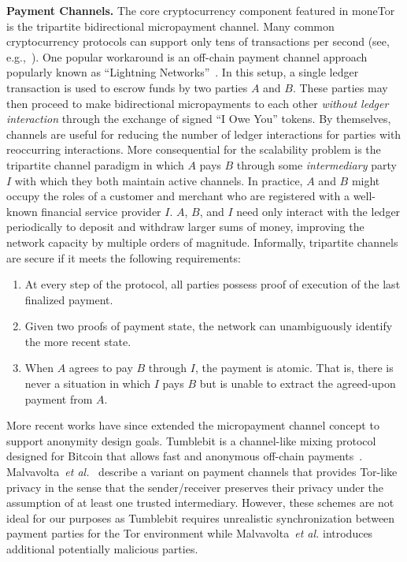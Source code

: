 \medskip \noindent\textbf{Payment Channels.}
The core cryptocurrency component featured in moneTor is the tripartite bidirectional micropayment channel.
Many common cryptocurrency protocols can support only tens of transactions per second (see, e.g.,~\cite{team2018blockchain}).
One popular workaround is an off-chain payment channel approach popularly known as ``Lightning Networks''~\cite{poon2016bitcoin}.
In this setup, a single ledger transaction is used to escrow funds by two parties $A$ and $B$.
These parties may then proceed to make bidirectional micropayments to each other \emph{without ledger interaction} through the exchange of signed ``I Owe You'' tokens.
By themselves, channels are useful for reducing the number of ledger interactions for parties with reoccurring interactions.
More consequential for the scalability problem is the tripartite channel paradigm in which $A$ pays $B$ through some \emph{intermediary} party $I$ with which they both maintain active channels.
In practice, $A$ and $B$ might occupy the roles of a customer and merchant who are registered with a well-known financial service provider $I$.
$A$, $B$, and $I$ need only interact with the ledger periodically to deposit and withdraw larger sums of money, improving the network capacity by multiple orders of magnitude.
Informally, tripartite channels are secure if it meets the following requirements:

\begin{enumerate}
\item At every step of the protocol, all parties possess proof of execution of the last finalized payment.
\item Given two proofs of payment state, the network can unambiguously identify the more recent state.
\item When $A$ agrees to pay $B$ through $I$, the payment is atomic.
  That is, there is never a situation in which $I$ pays $B$ but is unable to extract the agreed-upon payment from $A$.
\end{enumerate}

More recent works have since extended the micropayment channel concept to support anonymity design goals.
Tumblebit is a channel-like mixing protocol designed for Bitcoin that allows fast and anonymous off-chain payments~\cite{heilman2017tumblebit}.
Malvavolta~\textit{et al.}~\cite{malavolta2017concurrency} describe a variant on payment channels that provides Tor-like privacy in the sense that the sender/receiver preserves their privacy under the assumption of at least one trusted intermediary.
However, these schemes are not ideal for our purposes as Tumblebit requires unrealistic synchronization between payment parties for the Tor environment while Malvavolta~\textit{et al.}
introduces additional potentially malicious parties.

